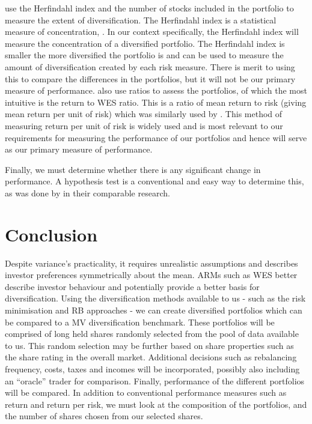 \documentclass[12pt,a4paper]{article}
\begin{document}
\cite{CHEN20111777} use the Herfindahl index and the number of stocks included in the portfolio to measure the extent of diversification. The Herfindahl index is a statistical measure of concentration, \cite{rhoades1993herfindahl}. In our context specifically, the Herfindahl index will measure the concentration of a diversified portfolio. The Herfindahl index is smaller the more diversified the portfolio is and can be used to measure the amount of diversification created by each risk measure. There is merit to using this to compare the differences in the portfolios, but it will not be our primary measure of performance.
\cite{CHEN20111777} also use ratios to assess the portfolios, of which the most intuitive is the return to WES ratio. This is a ratio of mean return to risk (giving mean return per unit of risk) which was similarly used by \cite{hoe2010empirical}. This method of measuring return per unit of risk is widely used and is most relevant to our requirements for measuring the performance of our portfolios and hence will serve as our primary measure of performance.

Finally, we must determine whether there is any significant change in performance. A hypothesis test is a conventional and easy way to determine this, as was done by \cite{righi2017simulation} in their comparable research.

\section{Conclusion}
\label{sec:Concl}

Despite variance's practicality, it requires unrealistic assumptions and describes investor preferences symmetrically about the mean. ARMs such as WES better describe investor behaviour and potentially provide a better basis for diversification. Using the diversification methods available to us - such as the risk minimisation and RB approaches - we can create diversified portfolios which can be compared to a MV diversification benchmark. These portfolios will be comprised of long held shares randomly selected from the pool of data available to us. This random selection may be further based on share properties such as the share rating in the overall market. Additional decisions such as rebalancing frequency, costs, taxes and incomes will be incorporated, possibly also including an ``oracle'' trader for comparison. Finally, performance of the different portfolios will be compared. In addition to conventional performance measures such as return and return per risk, we must look at the composition of the portfolios, and the number of shares chosen from our selected shares.

\newpage


\label{bib:bibliography}
 
\end{document}
